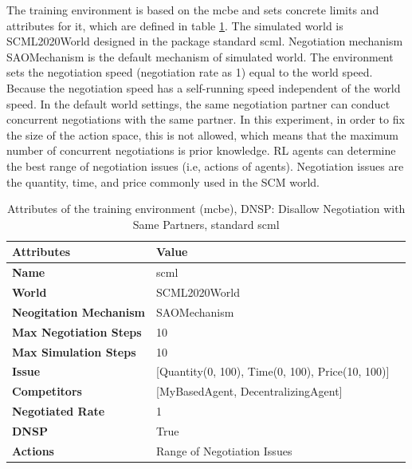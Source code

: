 The training environment is based on the \gls{mcbe} and sets concrete limits and attributes for it, which are defined in table \ref{tab:attributes-mcbe-dynamical-range-negotiation-issue}. The simulated world is SCML2020World designed in the package standard scml. Negotiation mechanism SAOMechanism is the default mechanism of simulated world. The environment sets the negotiation speed (negotiation rate as 1) equal to the world speed. Because the negotiation speed has a self-running speed independent of the world speed. In the default world settings, the same negotiation partner can conduct concurrent negotiations with the same partner. In this experiment, in order to fix the size of the action space, this is not allowed, which means that the maximum number of concurrent negotiations is prior knowledge. RL agents can determine the best range of negotiation issues (i.e, actions of agents). Negotiation issues are the quantity, time, and price commonly used in the SCM world.

\begin{table}[htbp]
\centering
\begin{tabular}{l l l} \toprule
\bfseries \textbf{Attributes}    & \bfseries \textbf{Value}                                             \\ \midrule
\textbf{Name}                    & scml                                                                 \\
\textbf{World}                   & SCML2020World                                                        \\
\textbf{Neogitation Mechanism}   & SAOMechanism                                                         \\
\textbf{Max Negotiation Steps}   & 10                                                                   \\
\textbf{Max Simulation Steps}    & 10                                                                   \\
\textbf{Issue}             	     & [Quantity(0, 100), Time(0, 100), Price(10, 100)]                     \\
\textbf{Competitors}             & [MyBasedAgent, DecentralizingAgent]                                  \\
\textbf{Negotiated Rate}         &    1                                                                 \\
\textbf{DNSP}                    &    True                             \\
\textbf{Actions}                 & Range of Negotiation Issues                                          \\
\bottomrule
\end{tabular}
\caption{Attributes of the training environment (mcbe), DNSP: Disallow Negotiation with Same Partners, standard scml}
\label{tab:attributes-mcbe-dynamical-range-negotiation-issue}
\end{table}

